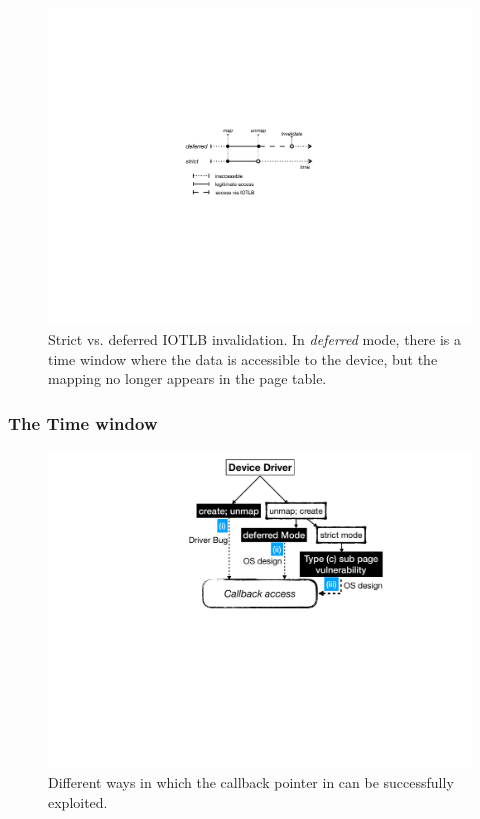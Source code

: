 \begin{figure}[t]
    \centering
    \includegraphics[width=0.75\columnwidth]{figs/strict.pdf}
    \caption{Strict vs. deferred IOTLB invalidation. In \emph{deferred} mode, there is a time window where the data is accessible to the device, but the mapping no longer appears in the page table.}
    \label{fig:deferred}
\end{figure}

\subsubsection{The Time window}\label{sec:shinfo}

\begin{figure}[t]
    \centering
    \includegraphics[width=0.75\linewidth]{figs/road_to_op.pdf}
    \caption{Different ways in which the callback pointer in \shinfo can be successfully exploited.}
    \label{fig:road_to_op}
\end{figure}


